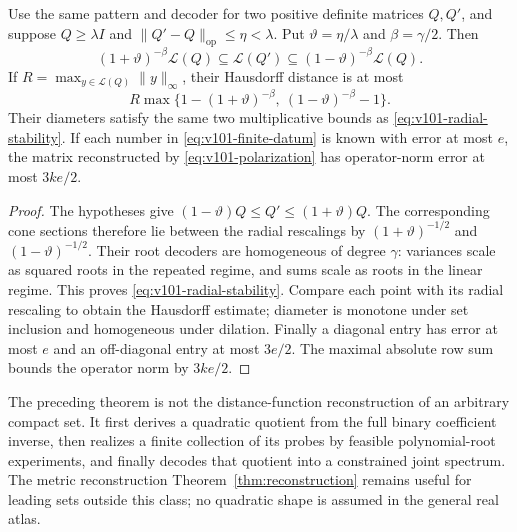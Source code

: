 \begin{corollary}\label{cor:v101-stability}
Use the same pattern and decoder for two positive definite matrices
$Q,Q'$, and suppose $Q\ge\lambda I$ and
$\|Q'-Q\|_{\mathrm{op}}\le\eta<\lambda$. Put
$\vartheta=\eta/\lambda$ and $\beta=\gamma/2$. Then
\begin{equation}\label{eq:v101-radial-stability}
 (1+\vartheta)^{-\beta}\mathcal L(Q)
 \subseteq\mathcal L(Q')
 \subseteq(1-\vartheta)^{-\beta}\mathcal L(Q).
\end{equation}
If $R=\max_{y\in\mathcal L(Q)}\|y\|_\infty$, their Hausdorff distance
is at most
\[
 R\max\{1-(1+\vartheta)^{-\beta},\
                  (1-\vartheta)^{-\beta}-1\}.
\]
Their diameters satisfy the same two multiplicative bounds as
\eqref{eq:v101-radial-stability}. If each number in
\eqref{eq:v101-finite-datum} is known with error at most $e$, the
matrix reconstructed by \eqref{eq:v101-polarization} has operator-norm
error at most $3ke/2$.
\end{corollary}
\begin{proof}
The hypotheses give $(1-\vartheta)Q\le Q'\le(1+\vartheta)Q$.
The corresponding cone sections therefore lie between the radial
rescalings by $(1+\vartheta)^{-1/2}$ and
$(1-\vartheta)^{-1/2}$. Their root decoders are homogeneous of degree
$\gamma$: variances scale as squared roots in the repeated regime,
and sums scale as roots in the linear regime. This proves
\eqref{eq:v101-radial-stability}. Compare each point with its radial
rescaling to obtain the Hausdorff estimate; diameter is monotone under
set inclusion and homogeneous under dilation. Finally a diagonal entry
has error at most $e$ and an off-diagonal entry at most $3e/2$.
The maximal absolute row sum bounds the operator norm by $3ke/2$.
\end{proof}

The preceding theorem is not the distance-function reconstruction of an
arbitrary compact set. It first derives a quadratic quotient from the
full binary coefficient inverse, then realizes a finite collection of
its probes by feasible polynomial-root experiments, and finally decodes
that quotient into a constrained joint spectrum. The metric
reconstruction Theorem~\ref{thm:reconstruction} remains useful
for leading sets outside this class; no quadratic shape is assumed in
the general real atlas.
